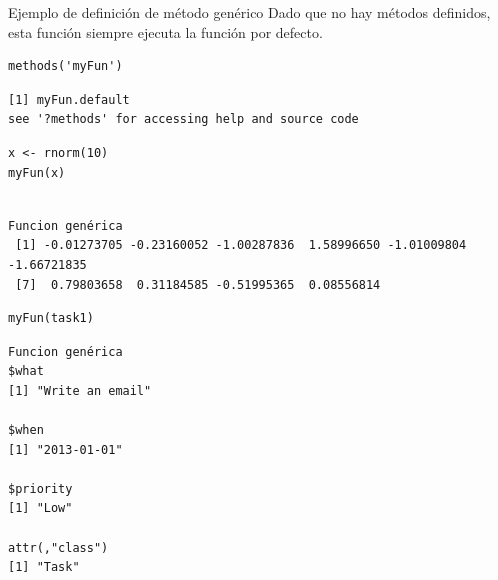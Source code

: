 \documentclass[xcolor={usenames,svgnames,dvipsnames}]{beamer}
\begin{document}
\begin{frame}[label={sec:org86445ff},fragile]{Ejemplo de definición de método genérico}
 Dado que no hay métodos definidos, esta función siempre ejecuta la función por defecto.
\lstset{language=r,label= ,caption= ,captionpos=b,numbers=none}
\begin{lstlisting}
methods('myFun')
\end{lstlisting}

\begin{verbatim}
[1] myFun.default
see '?methods' for accessing help and source code
\end{verbatim}


\lstset{language=r,label= ,caption= ,captionpos=b,numbers=none}
\begin{lstlisting}
x <- rnorm(10)
myFun(x)
\end{lstlisting}

\begin{verbatim}

Funcion genérica
 [1] -0.01273705 -0.23160052 -1.00287836  1.58996650 -1.01009804 -1.66721835
 [7]  0.79803658  0.31184585 -0.51995365  0.08556814
\end{verbatim}


\lstset{language=r,label= ,caption= ,captionpos=b,numbers=none}
\begin{lstlisting}
myFun(task1)
\end{lstlisting}

\begin{verbatim}
Funcion genérica
$what
[1] "Write an email"

$when
[1] "2013-01-01"

$priority
[1] "Low"

attr(,"class")
[1] "Task"
\end{verbatim}
\end{frame}
\end{document}
